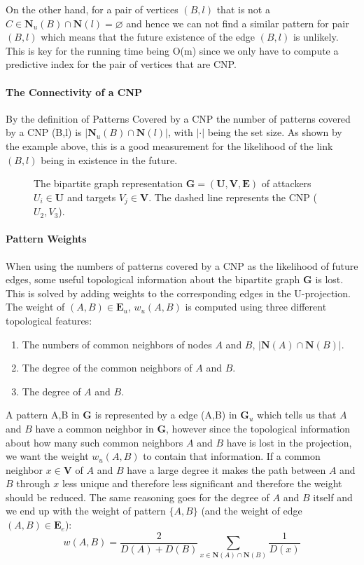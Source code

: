 On the other hand, for a pair of vertices $(B,l)$ that is not a $C\in\textbf{N}_u(B)\cap\textbf{N}(l) = \varnothing$ and hence we can not find a similar pattern for pair $(B,l)$ which means that the future existence of the edge $(B,l)$ is unlikely. This is key for the running time being O(m) since we only have to compute a predictive index for the pair of vertices that are CNP.

\paragraph{The Connectivity of a CNP}
By the definition of Patterns Covered by a CNP the number of patterns covered by a CNP (B,l) is $|\textbf{N}_u(B)\cap\textbf{N}(l)|$, with $|\cdot|$ being the set size. As shown by the example above, this is a good measurement for the likelihood of the link $(B,l)$ being in existence in the future.

\begin{figure}[!ht]
\centering

\caption{\label{fig:cnp} The bipartite graph representation $\textbf{G}=(\textbf{U},\textbf{V},\textbf{E})$ of attackers $U_i\in\textbf{U}$ and targets $V_j\in\textbf{V}$. The dashed line represents the CNP ($U_2,V_3$).}
\end{figure}

\paragraph{Pattern Weights}
When using the numbers of patterns covered by a CNP as the likelihood of future edges, some useful topological information about the bipartite graph $\textbf{G}$ is lost. This is solved by adding weights to the corresponding edges in the U-projection. The weight of $(A,B)\in\textbf{E}_u$, $w_u(A,B)$ is computed using three different topological features:
\begin{enumerate}
\item The numbers of common neighbors of nodes $A$ and $B$, $|\textbf{N}(A)\cap\textbf{N}(B)|$.
\item The degree of the common neighbors of $A$ and $B$.
\item The degree of $A$ and $B$.
\end{enumerate}
A pattern {A,B} in $\textbf{G}$ is represented by a edge (A,B) in $\textbf{G}_u$ which tells us that $A$ and $B$ have a common neighbor in $\textbf{G}$, however since the topological information about how many such common neighbors $A$ and $B$ have is lost in the projection, we want the weight $w_u(A,B)$ to contain that information. If a common neighbor $x\in\textbf{V}$ of $A$ and $B$ have a large degree it makes the path between $A$ and $B$ through $x$ less unique and therefore less significant and therefore the weight should be reduced. The same reasoning goes for the degree of $A$ and $B$ itself and we end up with the weight of pattern $\{A,B\}$ (and the weight of edge $(A,B)\in\textbf{E}_e$):
$$
    w(A,B) = \frac{2}{D(A)+D(B)} \sum_{x\in\textbf{N}(A)\cap\textbf{N}(B)} \frac{1}{D(x)}
$$

